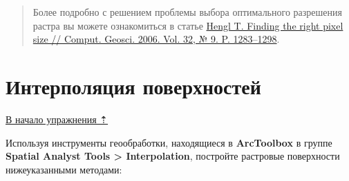 \documentclass[12pt,]{book}
\begin{document}
\begin{quote}
Более подробно с решением проблемы выбора оптимального разрешения растра вы можете ознакомиться в статье \href{https://www.researchgate.net/publication/222014409_Finding_the_right_pixel_size}{Hengl T. Finding the right pixel size // Comput. Geosci. 2006. Vol. 32, № 9. P. 1283--1298}.
\end{quote}

\hypertarget{interpolation-surfaces}{%
\section{Интерполяция поверхностей}\label{interpolation-surfaces}}

\protect\hyperlink{interpolation}{В начало упражнения ⇡}

Используя инструменты геообработки, находящиеся в \textbf{ArcToolbox} в группе \textbf{Spatial Analyst Tools \textgreater{} Interpolation}, постройте растровые поверхности нижеуказанными методами:
\end{document}
